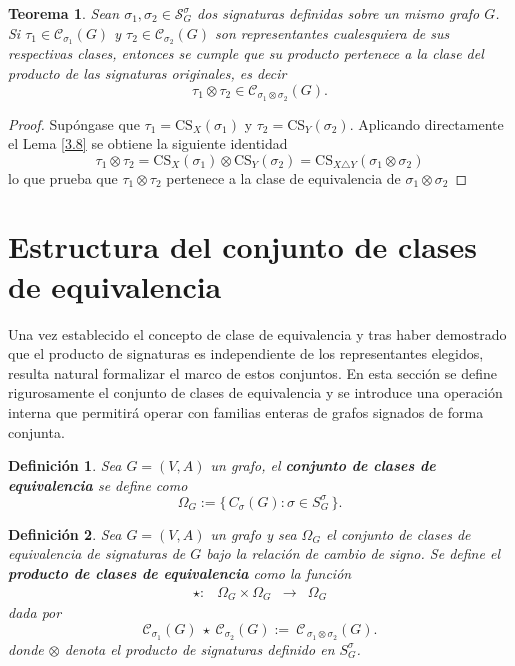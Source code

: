 \documentclass[11pt,a4paper,spanish]{report}
\theoremstyle{plain}
\newtheorem{teorema}{Teorema}[chapter]
\newtheorem{definicion}{Definición}[chapter]
\begin{document}
\begin{teorema} \label{tma:buenadefinicion}
Sean $\sigma_1, \sigma_2 \in \mathcal{S}_G^\sigma$ dos signaturas definidas sobre un mismo grafo $G$. Si $\tau_1 \in \mathcal{C}_{\sigma_1}(G)$ y $\tau_2 \in \mathcal{C}_{\sigma_2}(G)$ son representantes cualesquiera de sus respectivas clases, entonces se cumple que su producto pertenece a la clase del producto de las signaturas originales, es decir
\[
\tau_1 \otimes \tau_2 \in \mathcal{C}_{\sigma_1 \otimes \sigma_2}(G).
\]
\end{teorema}


\begin{proof}
Supóngase que $\tau_1 = \mathrm{CS}_X(\sigma_1)$ y $\tau_2 = \mathrm{CS}_Y(\sigma_2)$. Aplicando directamente el Lema \ref{3.8} se obtiene la siguiente identidad
\[
\tau_1 \otimes \tau_2 = \mathrm{CS}_X(\sigma_1) \otimes \mathrm{CS}_Y(\sigma_2) = \mathrm{CS}_{X \triangle Y}(\sigma_1 \otimes \sigma_2)
\]
lo que prueba que $\tau_1 \otimes \tau_2$ pertenece a la clase de equivalencia de $\sigma_1 \otimes \sigma_2$
\end{proof}
\section{Estructura del conjunto de clases de equivalencia}
Una vez establecido el concepto de clase de equivalencia y tras haber demostrado que el producto de signaturas es independiente de los representantes elegidos, resulta natural formalizar el marco de estos conjuntos. En esta sección se define rigurosamente el conjunto de clases de equivalencia y se introduce una operación interna que permitirá operar con familias enteras de grafos signados de forma conjunta.


\begin{definicion}
Sea $G=(V,A)$ un grafo, el \textbf{conjunto de clases de equivalencia} se define como  
\[
\Omega_G := \{\, C_{\sigma}(G) : \sigma \in S^{\sigma}_G \,\}
.\]
\end{definicion}

\begin{definicion}\label{def:producto_clases}
Sea $G=(V,A)$ un grafo y sea 
$\Omega_G$ el conjunto de clases de equivalencia de signaturas de $G$ bajo la relación de cambio de signo. Se define el \textbf{producto de clases de equivalencia} como la función
\[
\begin{array}{cccc}
\star : & \Omega_G \times \Omega_G & \longrightarrow & \Omega_G 
\end{array}
\]
dada por
\[
\mathcal{C}_{\sigma_1}(G)\ \star\ \mathcal{C}_{\sigma_2}(G)
:=\ \mathcal{C}_{\,\sigma_1\otimes\sigma_2}(G).
\]
donde $\otimes$ denota el producto de signaturas definido en $S^{\sigma}_G$.
\end{definicion}
\end{document}
